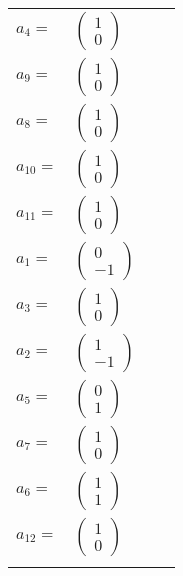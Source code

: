 \documentclass[1p]{elsarticle_modified}
\theoremstyle{definition}
\begin{document}
\begin{tabular}{m{7pt} m{180pt} m{7pt} m{180pt} }
\flushright $a_{4}=$&$\begin{pmatrix}1\\0\end{pmatrix}$ \\
\flushright $a_{9}=$&$\begin{pmatrix}1\\0\end{pmatrix}$ \\
\flushright $a_{8}=$&$\begin{pmatrix}1\\0\end{pmatrix}$ \\
\flushright $a_{10}=$&$\begin{pmatrix}1\\0\end{pmatrix}$ \\
\flushright $a_{11}=$&$\begin{pmatrix}1\\0\end{pmatrix}$ \\
\flushright $a_{1}=$&$\begin{pmatrix}0\\-1\end{pmatrix}$ \\
\flushright $a_{3}=$&$\begin{pmatrix}1\\0\end{pmatrix}$ \\
\flushright $a_{2}=$&$\begin{pmatrix}1\\-1\end{pmatrix}$ \\
\flushright $a_{5}=$&$\begin{pmatrix}0\\1\end{pmatrix}$ \\
\flushright $a_{7}=$&$\begin{pmatrix}1\\0\end{pmatrix}$ \\
\flushright $a_{6}=$&$\begin{pmatrix}1\\1\end{pmatrix}$ \\
\flushright $a_{12}=$&$\begin{pmatrix}1\\0\end{pmatrix}$\\&\end{tabular}
\end{document}
